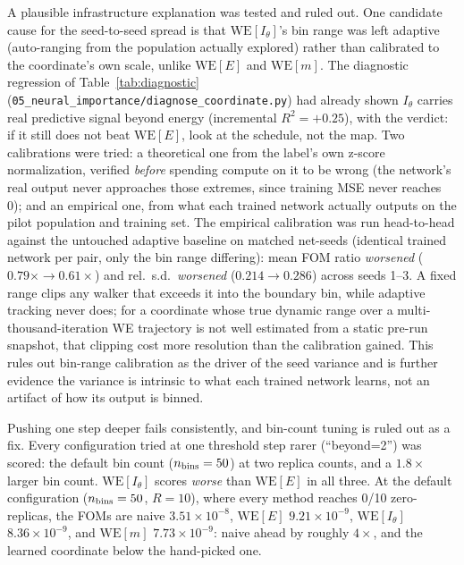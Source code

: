 \documentclass[a4paper,fleqn]{cas-sc}
\begin{document}
A plausible infrastructure explanation was tested and ruled out. One candidate
cause for the seed-to-seed spread is that $\mathrm{WE}[I_\theta]$'s bin range was left
adaptive (auto-ranging from the population actually explored) rather than calibrated to
the coordinate's own scale, unlike $\mathrm{WE}[E]$ and $\mathrm{WE}[m]$. The diagnostic
regression of Table~\ref{tab:diagnostic}
(\texttt{05\_neural\_importance/diagnose\_coordinate.py}) had
already shown $I_\theta$ carries real predictive signal beyond energy (incremental
$R^2=+0.25$), with the verdict: if it still does not beat $\mathrm{WE}[E]$, look at the
schedule, not the map. Two calibrations were tried: a theoretical one from the label's
own z-score normalization, verified \emph{before} spending compute on it to be wrong (the
network's real output never approaches those extremes, since training MSE never reaches
0); and an empirical one, from what each trained network actually outputs on the pilot
population and training set. The empirical calibration was run head-to-head against the
untouched adaptive baseline on matched net-seeds (identical trained network per pair,
only the bin range differing): mean FOM ratio \emph{worsened} ($0.79\times\to0.61\times$)
and rel.\ s.d.\ \emph{worsened} ($0.214\to0.286$) across seeds 1--3. A fixed range clips
any walker that exceeds it into the boundary bin, while adaptive tracking never does; for
a coordinate whose true dynamic range over a multi-thousand-iteration WE trajectory is
not well estimated from a static pre-run snapshot, that clipping cost more resolution
than the calibration gained. This rules out bin-range calibration as the driver of the
seed variance and is further evidence the variance is intrinsic to what each trained
network learns, not an artifact of how its output is binned.

Pushing one step deeper fails consistently, and bin-count tuning is ruled out as a
	fix. Every configuration tried at one threshold step rarer (``beyond=2'') was scored:
the default bin count ($n_{\rm bins}=50$) at two replica counts, and a $1.8\times$ larger
bin count. $\mathrm{WE}[I_\theta]$ scores \emph{worse} than $\mathrm{WE}[E]$ in all
three. At the default configuration ($n_{\rm bins}=50$, $R=10$), where every method
reaches 0/10 zero-replicas, the FOMs are naive $3.51\times10^{-8}$, $\mathrm{WE}[E]$
$9.21\times10^{-9}$, $\mathrm{WE}[I_\theta]$ $8.36\times10^{-9}$, and $\mathrm{WE}[m]$
$7.73\times10^{-9}$: naive ahead by roughly $4\times$, and the learned coordinate below
the hand-picked one.
\end{document}
